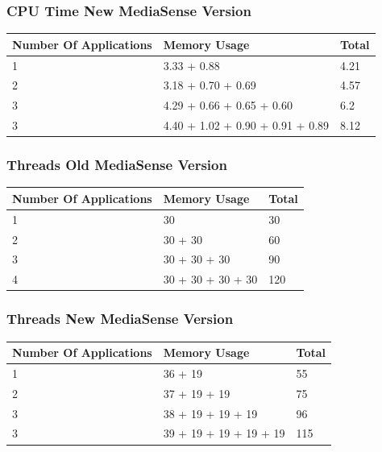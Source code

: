 \subsubsection{CPU Time New MediaSense Version}
\begin{center}
    \begin{tabular}{ | l | p{9cm} | l |}
    \hline
    Number Of Applications 								& Memory Usage 											& Total\\ \hline
    1 													& 3.33 + 0.88		 									& 4.21\\ \hline
    2 													& 3.18 + 0.70 + 0.69			  						& 4.57\\ \hline
    3 													& 4.29 + 0.66 + 0.65 + 0.60				  				& 6.2\\ \hline
    3 													& 4.40 + 1.02 + 0.90 + 0.91 + 0.89					 	& 8.12\\ \hline
    \end{tabular}
\end{center}




\subsubsection{Threads Old MediaSense Version}
\begin{center}
    \begin{tabular}{ | l | p{9cm} | l |}
    \hline
    Number Of Applications 								& Memory Usage 									& Total\\ \hline
    1 													& 30 											& 30\\ \hline
    2 													& 30 + 30										& 60\\ \hline
    3 													& 30 + 30 + 30 									& 90\\ \hline
    4 													& 30 + 30 + 30 + 30								& 120\\ \hline
    \end{tabular}
\end{center}

\subsubsection{Threads New MediaSense Version}
\begin{center}
    \begin{tabular}{ | l | p{9cm} | l |}
    \hline
    Number Of Applications 								& Memory Usage 											& Total\\ \hline
    1 													& 36 + 19			 									& 55\\ \hline
    2 													& 37 + 19 + 19					  						& 75\\ \hline
    3 													& 38 + 19 + 19 + 19						  				& 96\\ \hline
    3 													& 39 + 19 + 19 + 19 + 19							 	& 115\\ \hline
    \end{tabular}
\end{center}


